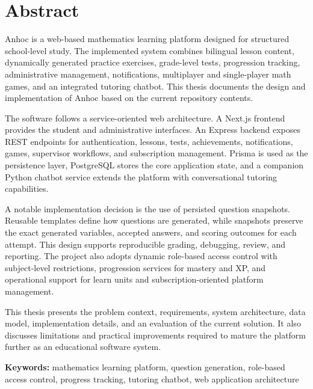 \documentclass[12pt,a4paper,twoside]{book}
\begin{document}
\clearpage
{}
\listoftables
\thispagestyle{plain}

\clearpage
{}
\listoffigures
\thispagestyle{plain}

\clearpage
\chapter*{Abstract}
\thispagestyle{plain}
Anhoc is a web-based mathematics learning platform designed for structured school-level study. The
implemented system combines bilingual lesson content, dynamically generated practice exercises,
grade-level tests, progression tracking, administrative management, notifications, multiplayer and
single-player math games, and an integrated tutoring chatbot. This thesis documents the design
and implementation of Anhoc based on the current repository contents.

The software follows a service-oriented web architecture. A Next.js frontend provides the student
and administrative interfaces. An Express backend exposes REST endpoints for authentication,
lessons, tests, achievements, notifications, games, supervisor workflows, and subscription
management. Prisma is used as the persistence layer, PostgreSQL stores the core application
state, and a companion Python chatbot service extends the platform with conversational tutoring
capabilities.

A notable implementation decision is the use of persisted question snapshots. Reusable templates
define how questions are generated, while snapshots preserve the exact generated variables,
accepted answers, and scoring outcomes for each attempt. This design supports reproducible
grading, debugging, review, and reporting. The project also adopts dynamic role-based access
control with subject-level restrictions, progression services for mastery and XP, and operational
support for learn units and subscription-oriented platform management.

This thesis presents the problem context, requirements, system architecture, data model,
implementation details, and an evaluation of the current solution. It also discusses limitations
and practical improvements required to mature the platform further as an educational software
system.

\textbf{Keywords:} mathematics learning platform, question generation, role-based access control,
progress tracking, tutoring chatbot, web application architecture

\clearpage
\hypersetup{pageanchor=true,linkcolor=blue}
\mainmatter








\clearpage


\end{document}
